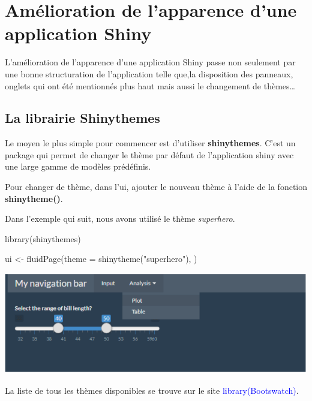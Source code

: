 \documentclass[
]{article}
\newenvironment{Shaded}{\begin{snugshade}}{\end{snugshade}}
\newcommand{\AttributeTok}[1]{\textcolor[rgb]{0.77,0.63,0.00}{#1}}
\newcommand{\FunctionTok}[1]{\textcolor[rgb]{0.00,0.00,0.00}{#1}}
\newcommand{\NormalTok}[1]{#1}
\newcommand{\OtherTok}[1]{\textcolor[rgb]{0.56,0.35,0.01}{#1}}
\newcommand{\StringTok}[1]{\textcolor[rgb]{0.31,0.60,0.02}{#1}}
\begin{document}
\hypertarget{amuxe9lioration-de-lapparence-dune-application-shiny}{%
\section{Amélioration de l'apparence d'une application
Shiny}\label{amuxe9lioration-de-lapparence-dune-application-shiny}}

L'amélioration de l'apparence d'une application Shiny passe non
seulement par une bonne structuration de l'application telle que,la
disposition des panneaux, onglets qui ont été mentionnés plus haut mais
aussi le changement de thèmes\ldots{}

\hypertarget{la-librairie-shinythemes}{%
\subsection{La librairie Shinythemes}\label{la-librairie-shinythemes}}

Le moyen le plus simple pour commencer est d'utiliser
\textbf{shinythemes}. C'est un package qui permet de changer le thème
par défaut de l'application shiny avec une large gamme de modèles
prédéfinis.

Pour changer de thème, dans l'ui, ajouter le nouveau thème à l'aide de
la fonction \textbf{shinytheme()}.

Dans l'exemple qui suit, nous avons utilisé le thème \emph{superhero}.

\begin{Shaded}
\begin{Highlighting}[]
\FunctionTok{library}\NormalTok{(shinythemes)}

\NormalTok{ui }\OtherTok{\textless{}{-}} \FunctionTok{fluidPage}\NormalTok{(}\AttributeTok{theme =} \FunctionTok{shinytheme}\NormalTok{(}\StringTok{"superhero"}\NormalTok{),}
\NormalTok{)}
\end{Highlighting}
\end{Shaded}

\includegraphics{images/superhero.png}

La liste de tous les thèmes disponibles se trouve sur le site
\textcolor{blue}{library(Bootswatch)}.
\end{document}
